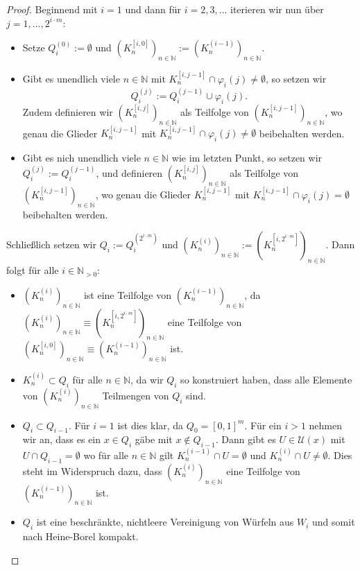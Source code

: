 \documentclass[a4paper,12pt]{article}
\theoremstyle{definition}
\theoremstyle{plain}
\def\N{\mathbb{N}}
\begin{document}
\begin{proof}
  Beginnend mit $i = 1$ und dann für $i = 2, 3, \ldots$ iterieren wir nun über $j = 1, \ldots, 2^{i \cdot m}$:
  \begin{itemize}
    \item Setze $Q_i^{(0)} := \emptyset$ und $(K_n^{[i, 0]})_{n \in \N} := (K_n^{(i-1)})_{n \in \N}$.
    \item Gibt es unendlich viele $n \in \N$ mit $K_n^{[i, j-1]} \cap \varphi_i(j) \neq \emptyset$, so setzen wir
    \[
    Q_i^{(j)} := Q_i^{(j-1)} \cup \varphi_i(j).
    \]
    Zudem definieren wir $(K_n^{[i, j]})_{n \in \N}$ als Teilfolge von $(K_n^{[i, j-1]})_{n \in \N}$, wo genau die Glieder $K_n^{[i, j-1]}$ mit $K_n^{[i, j-1]} \cap \varphi_i(j) \neq \emptyset$ beibehalten werden.
    \item Gibt es nich unendlich viele $n \in \N$ wie im letzten Punkt, so setzen wir $Q_i^{(j)} := Q_i^{(j-1)}$, und definieren $(K_n^{[i, j]})_{n \in \N}$ als Teilfolge von $(K_n^{[i, j-1]})_{n \in \N}$, wo genau die Glieder $K_n^{[i, j-1]}$ mit $K_n^{[i, j-1]} \cap \varphi_i(j) = \emptyset$ beibehalten werden.
  \end{itemize}
  Schließlich setzen wir $Q_i := Q_i^{(2^{i \cdot m})}$ und $(K_n^{(i)})_{n \in \N} := (K_n^{[i, 2^{i \cdot m}]})_{n \in \N}$. Dann folgt für alle $i \in \N_{>0}$:
  \begin{itemize}
    \item $(K_n^{(i)})_{n \in \N}$ ist eine Teilfolge von $(K_n^{(i-1)})_{n \in \N}$, da $(K_n^{(i)})_{n \in \N} \equiv (K_n^{[i, 2^{i \cdot m}]})_{n \in \N}$ eine Teilfolge von $(K_n^{[i, 0]})_{n \in \N} \equiv (K_n^{(i-1)})_{n \in \N}$ ist.
    \item $K_n^{(i)} \subset Q_i$ für alle $n \in \N$, da wir $Q_i$ so konstruiert haben, dass alle Elemente von $(K_n^{(i)})_{n \in \N}$ Teilmengen von $Q_i$ sind.
    \item $Q_i \subset Q_{i-1}$. Für $i = 1$ ist dies klar, da $Q_0 = [0,1]^m$. Für ein $i > 1$ nehmen wir an, dass es ein $x \in Q_i$ gäbe mit $x \notin Q_{i-1}$. Dann gibt es $U \in \mathcal{U}(x)$ mit $U \cap Q_{i-1} = \emptyset$ wo für alle $n \in \N$ gilt $K_n^{(i-1)} \cap U = \emptyset$ und $K_n^{(i)} \cap U \neq \emptyset$. Dies steht im Widerspruch dazu, dass $(K_n^{(i)})_{n \in \N}$ eine Teilfolge von $(K_n^{(i-1)})_{n \in \N}$ ist.
    \item $Q_i$ ist eine beschränkte, nichtleere Vereinigung von Würfeln aus $W_i$ und somit nach Heine-Borel kompakt.
  \end{itemize}


\end{proof}
\end{document}
